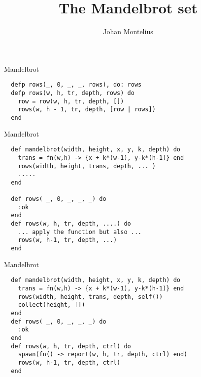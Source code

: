 

\title[ID1019 Parallel programming]{The Mandelbrot set}
 

\author{Johan Montelius}
\date{\semester}



\begin{frame}
\titlepage
\end{frame}

\begin{frame}[fragile]{Mandelbrot}

\begin{verbatim}
  defp rows(_, 0, _, _, rows), do: rows
  defp rows(w, h, tr, depth, rows) do
    row = row(w, h, tr, depth, [])
    rows(w, h - 1, tr, depth, [row | rows])
  end
\end{verbatim}

\pause\vspace{20pt}{\em How do we speed this up?}
\end{frame}

\begin{frame}[fragile]{Mandelbrot}

\begin{verbatim}
  def mandelbrot(width, height, x, y, k, depth) do
    trans = fn(w,h) -> {x + k*(w-1), y-k*(h-1)} end
    rows(width, height, trans, depth, ... )
    .....
  end

  def rows( _, 0, _, _, _) do
    :ok
  end
  def rows(w, h, tr, depth, ....) do
    ... apply the function but also ...
    rows(w, h-1, tr, depth, ...)
  end
\end{verbatim}

\end{frame}


\begin{frame}[fragile]{Mandelbrot}

\begin{verbatim}
  def mandelbrot(width, height, x, y, k, depth) do
    trans = fn(w,h) -> {x + k*(w-1), y-k*(h-1)} end
    rows(width, height, trans, depth, self())
    collect(height, [])
  end
  def rows( _, 0, _, _, _) do
    :ok
  end
  def rows(w, h, tr, depth, ctrl) do
    spawn(fn() -> report(w, h, tr, depth, ctrl) end)
    rows(w, h-1, tr, depth, ctrl)
  end
\end{verbatim}

\pause\vspace{20pt}{\em Write collect/2 and report/5, and give it a spin.}

\end{frame}

